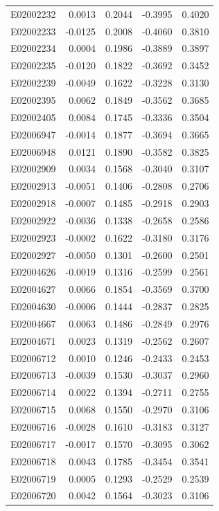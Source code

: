 \documentclass[11pt, a4paper]{article}
\begin{document}
\begin{longtable}{lrrrr}
E02002232 & 0.0013 & 0.2044 & -0.3995 & 0.4020 \\
E02002233 & -0.0125 & 0.2008 & -0.4060 & 0.3810 \\
E02002234 & 0.0004 & 0.1986 & -0.3889 & 0.3897 \\
E02002235 & -0.0120 & 0.1822 & -0.3692 & 0.3452 \\
E02002239 & -0.0049 & 0.1622 & -0.3228 & 0.3130 \\
E02002395 & 0.0062 & 0.1849 & -0.3562 & 0.3685 \\
E02002405 & 0.0084 & 0.1745 & -0.3336 & 0.3504 \\
E02006947 & -0.0014 & 0.1877 & -0.3694 & 0.3665 \\
E02006948 & 0.0121 & 0.1890 & -0.3582 & 0.3825 \\
E02002909 & 0.0034 & 0.1568 & -0.3040 & 0.3107 \\
E02002913 & -0.0051 & 0.1406 & -0.2808 & 0.2706 \\
E02002918 & -0.0007 & 0.1485 & -0.2918 & 0.2903 \\
E02002922 & -0.0036 & 0.1338 & -0.2658 & 0.2586 \\
E02002923 & -0.0002 & 0.1622 & -0.3180 & 0.3176 \\
E02002927 & -0.0050 & 0.1301 & -0.2600 & 0.2501 \\
E02004626 & -0.0019 & 0.1316 & -0.2599 & 0.2561 \\
E02004627 & 0.0066 & 0.1854 & -0.3569 & 0.3700 \\
E02004630 & -0.0006 & 0.1444 & -0.2837 & 0.2825 \\
E02004667 & 0.0063 & 0.1486 & -0.2849 & 0.2976 \\
E02004671 & 0.0023 & 0.1319 & -0.2562 & 0.2607 \\
E02006712 & 0.0010 & 0.1246 & -0.2433 & 0.2453 \\
E02006713 & -0.0039 & 0.1530 & -0.3037 & 0.2960 \\
E02006714 & 0.0022 & 0.1394 & -0.2711 & 0.2755 \\
E02006715 & 0.0068 & 0.1550 & -0.2970 & 0.3106 \\
E02006716 & -0.0028 & 0.1610 & -0.3183 & 0.3127 \\
E02006717 & -0.0017 & 0.1570 & -0.3095 & 0.3062 \\
E02006718 & 0.0043 & 0.1785 & -0.3454 & 0.3541 \\
E02006719 & 0.0005 & 0.1293 & -0.2529 & 0.2539 \\
E02006720 & 0.0042 & 0.1564 & -0.3023 & 0.3106 \\

\end{longtable}
\end{document}
